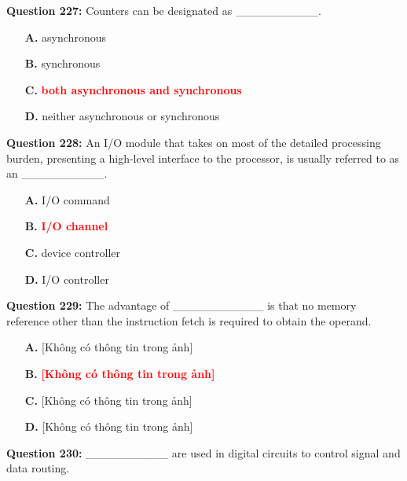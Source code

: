\documentclass[12pt,a4paper]{article}
\begin{document}
\vspace{0.5cm}

\textbf{Question 227:} Counters can be designated as __________.

\begin{itemize}
    \item[\textbf{A.}] asynchronous
    \item[\textbf{B.}] synchronous
    \item[\textbf{C.}] \textcolor{red}{\textbf{both asynchronous and synchronous}}
    \item[\textbf{D.}] neither asynchronous or synchronous
\end{itemize}

\vspace{0.5cm}

\textbf{Question 228:} An I/O module that takes on most of the detailed processing burden, presenting a high-level interface to the processor, is usually referred to as an __________.

\begin{itemize}
    \item[\textbf{A.}] I/O command
    \item[\textbf{B.}] \textcolor{red}{\textbf{I/O channel}}
    \item[\textbf{C.}] device controller
    \item[\textbf{D.}] I/O controller
\end{itemize}

\vspace{0.5cm}

\textbf{Question 229:} The advantage of ___________ is that no memory reference other than the instruction fetch is required to obtain the operand.

\begin{itemize}
    \item[\textbf{A.}] [Không có thông tin trong ảnh]
    \item[\textbf{B.}] \textcolor{red}{\textbf{[Không có thông tin trong ảnh]}}
    \item[\textbf{C.}] [Không có thông tin trong ảnh]
    \item[\textbf{D.}] [Không có thông tin trong ảnh]
\end{itemize}

\vspace{0.5cm}

\textbf{Question 230:} __________ are used in digital circuits to control signal and data routing.
\end{document}
